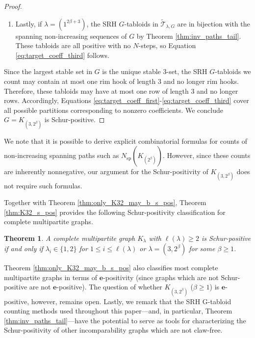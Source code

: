 \documentclass[12pt]{amsart}
\numberwithin{equation}{section}
\theoremstyle{plain}
\newtheorem{theorem}[equation]{Theorem}
\theoremstyle{definition}
\theoremstyle{remark}
\begin{document}
\begin{proof}
\begin{enumerate}
    
    \item Lastly, if $\lambda=(1^{2\beta+3})$, the SRH $G$-tabloids in $\tilde{\mathcal{T}}_{\lambda,G}$ are in bijection with the spanning non-increasing sequences of $G$ by Theorem \ref{thm:inv_paths_tail}. These tabloids are all positive with no $N$-steps, so Equation \ref{eq:target_coeff_third} follows.
    
    
\end{enumerate}
Since the largest stable set in $G$ is the unique stable $3$-set, the SRH $G$-tabloids we count may contain at most one rim hook of length $3$ and no longer rim hooks. Therefore, these tabloids may have at most one row of length $3$ and no longer rows. Accordingly, Equations \ref{eq:target_coeff_first}-\ref{eq:target_coeff_third} cover all possible partitions corresponding to nonzero coefficients. We conclude $G=K_{(3,2^{\beta})}$ is Schur-positive.
    
    
    
\end{proof}


We note that it is possible to derive explicit combinatorial formulas for counts of non-increasing spanning paths such as $N_{\mathrm{sp}}(K_{(2^{\beta})})$. However, since these counts are inherently nonnegative, our argument for the Schur-positivity of $K_{(3,2^{\beta})}$ does not require such formulas.


Together with Theorem \ref{thm:only_K32_may_b_s_pos}, Theorem \ref{thm:K32_s_pos} provides the following Schur-positivity classification for complete multipartite graphs.

\begin{theorem}
\label{thm:classif}
A complete multipartite graph $K_{\lambda}$ with $\ell(\lambda)\ge 2$ is Schur-positive if and only if $\lambda_i\in\{1,2\}$ for $1\le i \le \ell(\lambda)$ or $\lambda=(3,2^{\beta})$ for some $\beta\ge 1$.
\end{theorem}

Theorem \ref{thm:only_K32_may_b_s_pos} also classifies most complete multipartite graphs in terms of $\mathbf{e}$-positivity (since graphs which are not Schur-positive are not $\mathbf{e}$-positive). The question of whether $K_{(3,2^{\beta})}$ ($\beta\ge 1$) is $\mathbf{e}$-positive, however, remains open. Lastly, we remark that the SRH G-tabloid counting methods used throughout this paper---and, in particular, Theorem \ref{thm:inv_paths_tail}---have the potential to serve as tools for characterizing the Schur-positivity of other incomparability graphs which are not claw-free.






\end{document}
